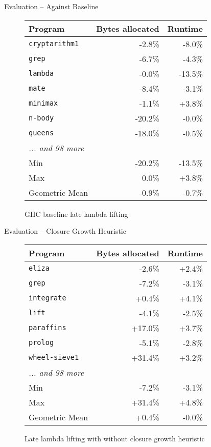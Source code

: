 \documentclass{haskellbeamer}
\newcommand{\progname}[1]{\texttt{#1}}
\newcommand{\totalname}[1]{#1}
\newcommand{\andmore}[1]{\emph{... and #1 more}}
\begin{document}
\begin{frame}[fragile]{Evaluation -- Against Baseline}
  \begin{figure}[t]
    \centering
    \begin{tabular}{lrr}
      \toprule
      Program & \multicolumn{1}{c}{Bytes allocated} & \multicolumn{1}{c}{Runtime} \\
      \midrule
      \progname{cryptarithm1} & -2.8\% & -8.0\%\\
      \progname{grep} & -6.7\% & -4.3\%\\
      \progname{lambda} & -0.0\% & -13.5\%\\
      \progname{mate} & -8.4\% & -3.1\%\\
      \progname{minimax} & -1.1\% & +3.8\%\\
      \progname{n-body} & -20.2\% & -0.0\%\\
      \progname{queens} & -18.0\% & -0.5\%\\
      \andmore{98} & & \\
      \midrule
      \totalname{Min} & -20.2\% & -13.5\%\\
      \totalname{Max} &  0.0\% & +3.8\%\\
      \totalname{Geometric Mean} & -0.9\% & -0.7\%\\
      \bottomrule
    \end{tabular}
    \caption{
      GHC baseline \vs late lambda lifting
    }
  \end{figure}
\end{frame}
 
\begin{frame}[fragile]{Evaluation -- Closure Growth Heuristic}
  \begin{figure}[t]
    \centering
    \begin{tabular}{lrr}
      \toprule
      Program & \multicolumn{1}{c}{Bytes allocated} & \multicolumn{1}{c}{Runtime} \\
      \midrule
\progname{eliza} & -2.6\% & +2.4\%\\
\progname{grep} & -7.2\% & -3.1\%\\
\progname{integrate} & +0.4\% & +4.1\%\\
\progname{lift} & -4.1\% & -2.5\%\\
\progname{paraffins} & +17.0\% & +3.7\%\\
\progname{prolog} & -5.1\% & -2.8\%\\
\progname{wheel-sieve1} & +31.4\% & +3.2\%\\
\andmore{98} & & \\
\midrule
\totalname{Min} & -7.2\% & -3.1\%\\
\totalname{Max} & +31.4\% & +4.8\%\\
\totalname{Geometric Mean} & +0.4\% & -0.0\%\\
    \end{tabular}
    \caption{
      Late lambda lifting with \vs without closure growth heuristic
    }
  \end{figure}
\end{frame}
  
\end{document}
